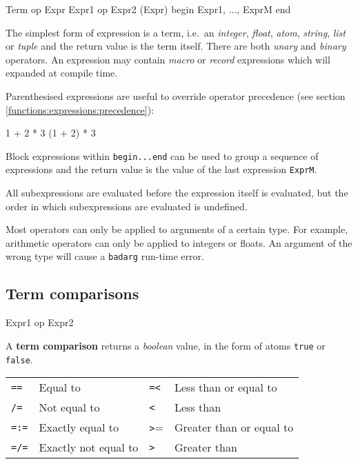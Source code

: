\begin{erlang}
Term
op Expr
Expr1 op Expr2
(Expr)
begin
   Expr1,
   ...,
   ExprM            %
end

\end{erlang}

The simplest form of expression is a term, i.e.~an \textit{integer},
\textit{float}, \textit{atom}, \textit{string}, \textit{list} or
\textit{tuple} and the return value is the term itself. 
There are both \textit{unary} and \textit{binary} operators. An expression
may contain \textit{macro} or \textit{record} expressions which will
expanded at compile time.

Parenthesised expressions are useful to override operator precedence (see section \ref{functions:expressions:precedence}):

\begin{erlang}
1 + 2 * 3           %
(1 + 2) * 3         %
\end{erlang}

Block expressions within \texttt{begin...end} can be used to group a
sequence of expressions and the return value is the value of the last
expression \texttt{ExprM}.

All subexpressions are evaluated before the expression itself is
evaluated, but the order in which subexpressions are evaluated is undefined.

Most operators can only be applied to arguments of a certain type. For
example, arithmetic operators can only be applied to integers or
floats. An argument of the wrong type will cause a \texttt{badarg}
run-time error.


\subsection{Term comparisons}
\begin{erlang}
Expr1 op Expr2
\end{erlang}

A \textbf{term comparison} returns a \textit{boolean} value,
in the form of atoms \texttt{true} or \texttt{false}.

\begin{center}
\begin{tabular}{|>{\raggedright}p{40pt}|>{\raggedright}p{105pt}|>{\raggedright}p{26pt}|>{\raggedright}p{124pt}|}
\hline
\multicolumn{4}{|p{297pt}|}{Comparison operators}\tabularnewline
\hline
\texttt{==} & Equal to & \texttt{=<} & Less than or equal to\tabularnewline
\hline
\texttt{/=} & Not equal to & \texttt{<} & Less than\tabularnewline
\hline
\texttt{=:=} & Exactly equal to & \texttt{>}= & Greater than or equal to\tabularnewline
\hline
\texttt{=/=} & Exactly not equal to & \texttt{>} & Greater than\tabularnewline
\hline
\end{tabular}
\end{center}


